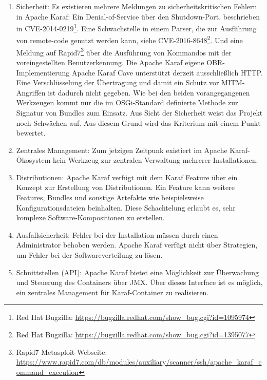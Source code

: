 \begin{enumerate}[label={Nr. \arabic*}, leftmargin=*, labelindent=1em]
 \item Sicherheit:
 Es existieren mehrere Meldungen zu sicherheitskritischen Fehlern in Apache Karaf:
 Ein Denial-of-Service über den Shutdown-Port, beschrieben in CVE-2014-0219\footnote{Red Hat Bugzilla: \url{https://bugzilla.redhat.com/show_bug.cgi?id=1095974}}.
 Eine Schwachstelle in einem Parser, die zur Ausführung von remote-code genutzt werden kann, siehe CVE-2016-8648\footnote{Red Hat Bugzilla: \url{https://bugzilla.redhat.com/show_bug.cgi?id=1395077}}.
 Und eine Meldung auf Rapid7\footnote{Rapid7 Metasploit Webseite: \url{https://www.rapid7.com/db/modules/auxiliary/scanner/ssh/apache_karaf_command_execution}}
 über die Ausführung von Kommandos mit der voreingestellten Benutzerkennung.
 Die Apache Karaf eigene \ac{OBR}-Implementierung Apache Karaf Cave unterstützt derzeit ausschließlich \ac{HTTP}.
 Eine Verschlüsselung der Übertragung und damit ein Schutz vor \ac{MITM}-Angriffen ist dadurch nicht gegeben.
 Wie bei den beiden vorangegangenen Werkzeugen kommt nur die im \ac{OSGi}-Standard definierte Methode zur Signatur von Bundles zum Einsatz.
 Aus Sicht der Sicherheit weist das Projekt noch Schwächen auf. Aus diesem Grund wird das Kriterium mit einem Punkt bewertet. 
 
 \item Zentrales Management: 
 Zum jetzigen Zeitpunk existiert im Apache Karaf-Ökosystem kein Werkzeug zur zentralen Verwaltung mehrerer Installationen. 
  
 \item Distributionen:
 Apache Karaf verfügt mit dem Karaf Feature über ein Konzept zur Erstellung von Distributionen. Ein Feature kann 
 weitere Features, Bundles und sonstige Artefakte wie beispielsweise Konfigurationsdateien beinhalten. Diese Schachtelung 
 erlaubt es, sehr komplexe Software-Kompositi\-onen zu erstellen.
  
 \item Ausfallsicherheit:
 Fehler bei der Installation müssen durch einen Administrator behoben werden.
 Apache Karaf verfügt nicht über Strategien, um Fehler bei der Softwareverteilung zu lösen.
 
 \item Schnittstellen (\ac{API}):
 Apache Karaf bietet eine Möglichkeit zur Überwachung und Steuerung des Containers über \ac{JMX}.
 Über dieses Interface ist es möglich, ein zentrales Management für Karaf-Container zu realisieren.
 

\end{enumerate}
